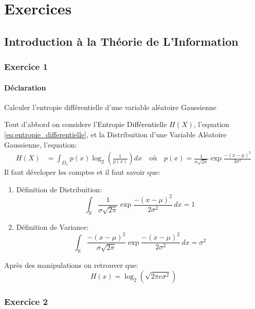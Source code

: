 \documentclass{article}
\begin{document}
\section{Exercices}

\subsection{Introduction à la Théorie de L'Information}
\subsubsection{Exercice 1}
\paragraph{Déclaration}Calculer l'entropie différentielle d'une variable aléatoire Gaussienne
\begin{resolution}
Tout d'abbord on considere l'Entropie Différentielle $H(X)$, l'equation \ref{eq:entropie_differentielle}, et la Distribuition d'une Variable Aléatoire Gaussienne, l'equation:
\begin{align*}
    H(X) &= \int_{D_x} p(x) \log_{2} \left( \frac{1}{p(x)} \right) dx
    \quad\text{où}\quad
    p(x) = \frac{1}{\sigma\sqrt{2\pi}} \exp{\frac{-(x - \mu)^2}{2\sigma^2}}
\end{align*}
Il faut déveloper les comptes et il faut savoir que:
\begin{enumerate}
    \item Définition de Distribuition:
    \begin{equation}
        \int_{\mathbb{R}} \frac{1}{\sigma\sqrt{2\pi}} \exp{\frac{-(x - \mu)^2}{2\sigma^2}}\,dx = 1
    \end{equation}
    \item Définition de Variance:
    \begin{equation}
        \int_{\mathbb{R}} \frac{-(x - \mu)^2}{\sigma\sqrt{2\pi}} \exp{\frac{-(x - \mu)^2}{2\sigma^2}}\,dx = \sigma^2
    \end{equation}
\end{enumerate}
Après des manipulations on retrouver que:
\begin{equation}
    \boxed{
        H(x) = \log_{2} (\sqrt{2\pi e \sigma^2})
    }
\end{equation}
\end{resolution}

\subsubsection{Exercice 2}
\end{document}
